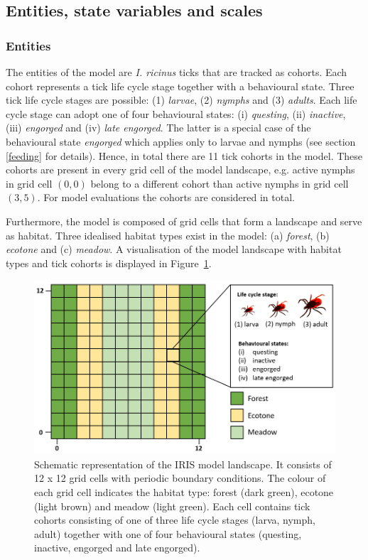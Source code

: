 \documentclass[a4paper, 11pt]{scrartcl}
\begin{document}
\subsection{Entities, state variables and scales}

\subsubsection{Entities}
The entities of the model are \emph{I. ricinus} ticks that are tracked as cohorts. Each cohort represents a tick life cycle stage together with a behavioural state. Three tick life cycle stages are possible: (1) \emph{larvae}, (2) \emph{nymphs} and (3) \emph{adults}. Each life cycle stage can adopt one of four behavioural states: (i) \emph{questing}, (ii) \emph{inactive}, (iii)  \emph{engorged} and (iv) \emph{late engorged}. The latter is a special case of the behavioural state \emph{engorged} which applies only to larvae and nymphs (see section \ref{feeding} for details). Hence, in total there are 11 tick cohorts in the model. These cohorts are present in every grid cell of the model landscape, e.g. active nymphs in grid cell $(0,0)$ belong to a different cohort than active nymphs in grid cell $(3,5)$. For model evaluations the cohorts are considered in total. 

Furthermore, the model is composed of grid cells that form a landscape and serve as habitat. Three idealised habitat types exist in the model: (a) \emph{forest}, (b) \emph{ecotone} and (c) \emph{meadow}. A visualisation of the model landscape with habitat types and tick cohorts is displayed in Figure~\ref{fig:iris_landscape}.

\begin{figure}[h!]
	\centering
	\includegraphics[width=0.75\linewidth]{figures/iris_landscape.png}
	\caption[Schematic representation of the IRIS model landscape.]{Schematic representation of the IRIS model landscape. It consists of 12 x 12 grid cells with periodic boundary conditions. The colour of each grid cell indicates the habitat type: forest (dark green), ecotone (light brown) and meadow (light green). Each cell contains tick cohorts consisting of one of three life cycle stages (larva, nymph, adult) together with one of four behavioural states (questing, inactive, engorged and late engorged).}
	\label{fig:iris_landscape}
\end{figure}
\end{document}

